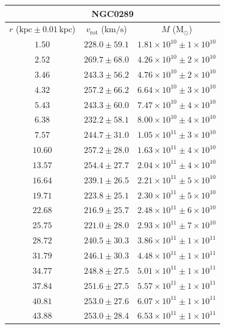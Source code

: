 \documentclass{article}
\newcommand\solmass{\textrm{M}_\odot}
\newcommand\kpc{\textrm{kpc}}
\newcommand\kmps{\textrm{km}/\textrm{s}}
\newcommand\vrot{\ensuremath{v_{\textrm{rot}}}}
\begin{document}
\begin{table}[h!]
    \begin{tabular}{|c|c|c|}
        \hline
        \multicolumn{3}{|c|}{NGC0289} \\
        \hline
        $r$ ($\kpc \pm 0.01 \,\kpc$) & $\vrot$ ($\kmps$) & $M$ ($\solmass$) \\
        \hline
        $1.50$ & $228.0 \pm 59.1$ & $1.81\times 10^{10} \pm 1\times 10^{10}$ \\
        $2.52$ & $269.7 \pm 68.0$ & $4.26\times 10^{10} \pm 2\times 10^{10}$ \\
        $3.46$ & $243.3 \pm 56.2$ & $4.76\times 10^{10} \pm 2\times 10^{10}$ \\
        $4.32$ & $257.2 \pm 66.2$ & $6.64\times 10^{10} \pm 3\times 10^{10}$ \\
        $5.43$ & $243.3 \pm 60.0$ & $7.47\times 10^{10} \pm 4\times 10^{10}$ \\
        $6.38$ & $232.2 \pm 58.1$ & $8.00\times 10^{10} \pm 4\times 10^{10}$ \\
        $7.57$ & $244.7 \pm 31.0$ & $1.05\times 10^{11} \pm 3\times 10^{10}$ \\
        $10.60$ & $257.2 \pm 28.0$ & $1.63\times 10^{11} \pm 4\times 10^{10}$ \\
        $13.57$ & $254.4 \pm 27.7$ & $2.04\times 10^{11} \pm 4\times 10^{10}$ \\
        $16.64$ & $239.1 \pm 26.5$ & $2.21\times 10^{11} \pm 5\times 10^{10}$ \\
        $19.71$ & $223.8 \pm 25.1$ & $2.30\times 10^{11} \pm 5\times 10^{10}$ \\
        $22.68$ & $216.9 \pm 25.7$ & $2.48\times 10^{11} \pm 6\times 10^{10}$ \\
        $25.75$ & $221.0 \pm 28.0$ & $2.93\times 10^{11} \pm 7\times 10^{10}$ \\
        $28.72$ & $240.5 \pm 30.3$ & $3.86\times 10^{11} \pm 1\times 10^{11}$ \\
        $31.79$ & $246.1 \pm 30.3$ & $4.48\times 10^{11} \pm 1\times 10^{11}$ \\
        $34.77$ & $248.8 \pm 27.5$ & $5.01\times 10^{11} \pm 1\times 10^{11}$ \\
        $37.84$ & $251.6 \pm 27.5$ & $5.57\times 10^{11} \pm 1\times 10^{11}$ \\
        $40.81$ & $253.0 \pm 27.6$ & $6.07\times 10^{11} \pm 1\times 10^{11}$ \\
        $43.88$ & $253.0 \pm 28.4$ & $6.53\times 10^{11} \pm 1\times 10^{11}$ \\

\end{tabular}
\end{table}
\end{document}
